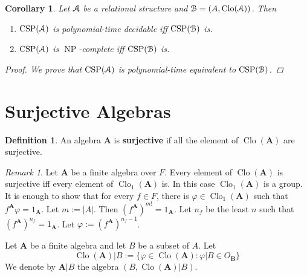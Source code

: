\documentclass{amsart}
\theoremstyle{plain}
\newtheorem{corollary}[theorem]{Corollary}
\theoremstyle{definition}
\newtheorem{definition}[theorem]{Definition}
\theoremstyle{remark}
\newtheorem{remark}[theorem]{Remark}
\def\phi{\varphi}
\DeclareMathOperator{\Clo}{Clo}
\DeclareMathOperator{\CSP}{CSP}
\DeclareMathOperator{\NP}{NP}
\begin{document}
\begin{corollary}
    Let $\EuScript{A}$ be a relational structure and $\EuScript{B}=(A, \Clo(\EuScript{A}))$. 
    Then 
    \begin{enumerate}
        \item $\CSP(\EuScript{A})$ is polynomial-time decidable iff $\CSP(\EuScript{B})$ is. 
        \item $\CSP(\EuScript{A})$ is $\NP$-complete iff $\CSP(\EuScript{B})$ is. 
    \end{enumerate}
    \begin{proof}
        We prove that $\CSP(\EuScript{A})$ is polynomial-time equivalent to $\CSP(\EuScript{B})$. 

    \end{proof}
\end{corollary}

\section{Surjective Algebras}

\begin{definition}
    An algebra $\mathbf{A}$ is \textbf{surjective} if all the element of $\Clo(\mathbf{A})$ are surjective. 
\end{definition}

\begin{remark}
    \label{surj_group}
    Let $\mathbf{A}$ be a finite algebra over $F$. 
    Every element of $\Clo(\mathbf{A})$ is surjective iff every element of $\Clo_1(\mathbf{A})$ is. 
    In this case $\Clo_1(\mathbf{A})$ is a group.
    It is enough to show that for every $f \in F$, there is $\phi \in \Clo_1(\mathbf{A})$ such that $f^\mathbf{A} \phi = 1_\mathbf{A}$. 
    Let $m:=|A|$. 
    Then $(f^{\mathbf{A}})^{m!}=1_\mathbf{A}$.
    Let $n_f$ be the least $n$ such that $(f^{\mathbf{A}})^{n_f}=1_\mathbf{A}$. 
    Let $\phi:=(f^{\mathbf{A}})^{n_f-1}$. 
\end{remark}

Let $\mathbf{A}$ be a finite algebra and let $B$ be a subset of $A$. 
Let 
\begin{equation*}
    \Clo(\mathbf{A})|B:=\{\phi \in \Clo(\mathbf{A}): \phi | B \in O_{\mathbf{B}} \}
\end{equation*} 
We denote by $\mathbf{A}|B$ the algebra $(B, \Clo(\mathbf{A})|B)$. 
\end{document}
